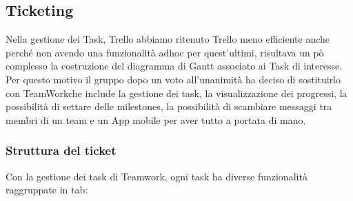 \documentclass[a4paper,11pt]{article}
\begin{document}
		\subsection{Ticketing}
		\label{subsec:ticketing}
		Nella gestione dei Task, Trello abbiamo ritenuto Trello meno efficiente anche perché non avendo una funzionalità adhoc per quest'ultimi, risultava un pò complesso la costruzione del diagramma di Gantt associato ai Task di interesse. Per questo motivo il gruppo dopo un voto all'unanimità ha deciso di sostituirlo con TeamWork\addglos che include la gestione dei task, la visualizzazione dei progressi, la possibilità di settare delle milestones, la possibilità di scambiare messaggi tra membri di un team e un App mobile per aver tutto a portata di mano.
		\subsubsection{Struttura del ticket}
		Con la gestione dei task di Teamwork, ogni task ha diverse funzionalità raggruppate in tab:
		
\end{document}
